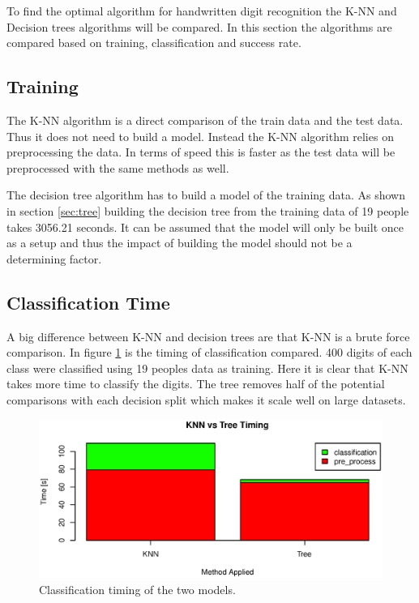 To find the optimal algorithm for handwritten digit recognition the K-NN and Decision trees algorithms will be compared.
In this section the algorithms are compared based on training, classification and success rate.

\subsection{Training}
The K-NN algorithm is a direct comparison of the train data and the test data.
Thus it does not need to build a model.
Instead the K-NN algorithm relies on preprocessing the data.
In terms of speed this is faster as the test data will be preprocessed with the same methods as well.

The decision tree algorithm has to build a model of the training data. 
As shown in section \ref{sec:tree} building the decision tree from the training data of 19 people takes 3056.21 seconds.
It can be assumed that the model will only be built once as a setup and thus the impact of building the model should not be a determining factor.

\subsection{Classification Time}
A big difference between K-NN and decision trees are that K-NN is a brute force comparison.
In figure \ref{fig:algo_compare_timing} is the timing of classification compared.
400 digits of each class were classified using 19 peoples data as training.
Here it is clear that K-NN takes more time to classify the digits.
The tree removes half of the potential comparisons with each decision split which makes it scale well on large datasets.

\begin{figure}[H]
\centering
\includegraphics[width=\textwidth]{graphics/algo_compare_timing}
\caption{Classification timing of the two models.}
\label{fig:algo_compare_timing}
\end{figure}

